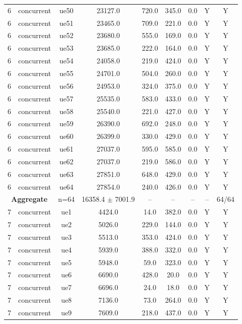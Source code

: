 \begin{table}[ht]
\begin{tabular}{|c|c|c|c|c|c|c|c|c|}
6 & concurrent & ue50 & 23127.0 & 720.0 & 345.0 & 0.0 & Y & Y \\
6 & concurrent & ue51 & 23465.0 & 709.0 & 221.0 & 0.0 & Y & Y \\
6 & concurrent & ue52 & 23680.0 & 555.0 & 169.0 & 0.0 & Y & Y \\
6 & concurrent & ue53 & 23685.0 & 222.0 & 164.0 & 0.0 & Y & Y \\
6 & concurrent & ue54 & 24058.0 & 219.0 & 424.0 & 0.0 & Y & Y \\
6 & concurrent & ue55 & 24701.0 & 504.0 & 260.0 & 0.0 & Y & Y \\
6 & concurrent & ue56 & 24953.0 & 324.0 & 375.0 & 0.0 & Y & Y \\
6 & concurrent & ue57 & 25535.0 & 583.0 & 433.0 & 0.0 & Y & Y \\
6 & concurrent & ue58 & 25540.0 & 221.0 & 427.0 & 0.0 & Y & Y \\
6 & concurrent & ue59 & 26390.0 & 692.0 & 248.0 & 0.0 & Y & Y \\
6 & concurrent & ue60 & 26399.0 & 330.0 & 429.0 & 0.0 & Y & Y \\
6 & concurrent & ue61 & 27037.0 & 595.0 & 585.0 & 0.0 & Y & Y \\
6 & concurrent & ue62 & 27037.0 & 219.0 & 586.0 & 0.0 & Y & Y \\
6 & concurrent & ue63 & 27851.0 & 648.0 & 429.0 & 0.0 & Y & Y \\
6 & concurrent & ue64 & 27854.0 & 240.0 & 426.0 & 0.0 & Y & Y \\
\multicolumn{2}{|c|}{\textbf{Aggregate}} & n=64 & 16358.4 $\pm$ 7001.9 & -- & -- & -- & -- & 64/64 \\
\hline
7 & concurrent & ue1 & 4424.0 & 14.0 & 382.0 & 0.0 & Y & Y \\
7 & concurrent & ue2 & 5026.0 & 229.0 & 144.0 & 0.0 & Y & Y \\
7 & concurrent & ue3 & 5513.0 & 353.0 & 424.0 & 0.0 & Y & Y \\
7 & concurrent & ue4 & 5939.0 & 388.0 & 332.0 & 0.0 & Y & Y \\
7 & concurrent & ue5 & 5948.0 & 59.0 & 323.0 & 0.0 & Y & Y \\
7 & concurrent & ue6 & 6690.0 & 428.0 & 20.0 & 0.0 & Y & Y \\
7 & concurrent & ue7 & 6696.0 & 24.0 & 18.0 & 0.0 & Y & Y \\
7 & concurrent & ue8 & 7136.0 & 73.0 & 264.0 & 0.0 & Y & Y \\
7 & concurrent & ue9 & 7609.0 & 218.0 & 437.0 & 0.0 & Y & Y \\

\end{tabular}
\end{table}
